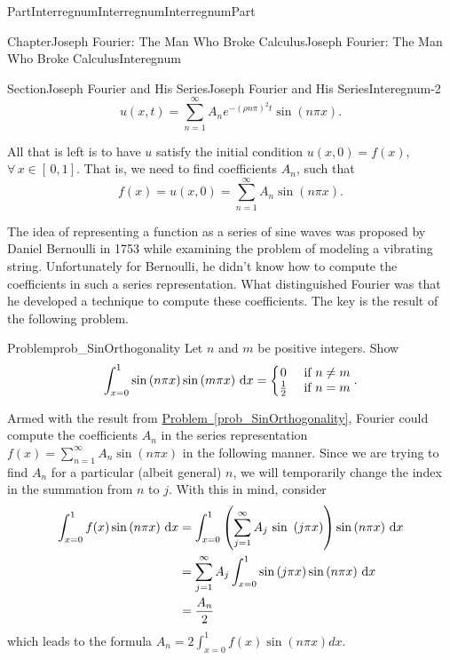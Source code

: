 \documentclass[oneside,10pt,]{book}
\newcommand{\xreffont}{\relax}
\numberwithin{equation}{part}
\newcommand{\dx}[1]{\,{\rm d}#1}
\newcommand{\amp}{&}
\begin{document}
\begin{partptx}{Part}{Interregnum}{}{Interregnum}{}{}{InterregnumPart}
\begin{chapterptx}{Chapter}{Joseph Fourier: The Man Who Broke Calculus}{}{Joseph Fourier: The Man Who Broke Calculus}{}{}{Interegnum}
\begin{sectionptx}{Section}{Joseph Fourier and His Series}{}{Joseph Fourier and His Series}{}{}{Interegnum-2}
\begin{equation*}
u(x,t)=\sum_{n=1}^\infty A_ne^{-(\rho n\pi)^2t}\sin\left(n\pi x\right)\text{.}
\end{equation*}
%
\par
All that is left is to have \(u\) satisfy the initial condition \(u(x,0)=f(x)\), \(\forall\,x\in[\,0,1]\). That is, we need to find coefficients \(A_n\), such that%
\begin{equation*}
f(x)=u(x,0)=\sum_{n=1}^\infty A_n\sin\left(n\pi x\right)\text{.}
\end{equation*}
%
\par
The idea of representing a function as a series of sine waves was proposed by Daniel Bernoulli in 1753 while examining the problem of modeling a vibrating string. Unfortunately for Bernoulli, he didn't know how to compute the coefficients in such a series representation. What distinguished Fourier was that he developed a technique to compute these coefficients. The key is the result of the following problem.%
\begin{problem}{Problem}{}{prob_SinOrthogonality}%
Let \(n\) and \(m\) be positive integers. Show%
\begin{equation*}
\int_{x=0}^1\sin\left(n\pi x\right)\sin\left(m\pi x\right)\dx{ x}= \left\{\begin{matrix}0\amp \text{ if } n\neq m\\ \frac{1}{2}\amp \text{ if } n=m \end{matrix} \right.. {}
\end{equation*}
%
\end{problem}
 Armed with the result from \hyperref[prob_SinOrthogonality]{Problem~{\xreffont\ref{prob_SinOrthogonality}}}, Fourier could compute the coefficients \(A_n\) in the series representation \(f(x)=\sum_{n=1}^\infty A_n \sin\left(n\pi x\right)\) in the following manner.  Since we are trying to find \(A_n\) for a particular (albeit general) \(n\), we will temporarily change the index in the summation from \(n\) to \(j\).  With this in mind, consider%
\begin{align*}
\int_{x=0}^1f(x)\sin\left(n\pi x\right)\dx{ x} \amp =\int_{x=0}^1\left(\sum_{j=1}^\infty A_j\text{ sin } \left(j\pi x\right)\right)\sin\left(n\pi x\right)\dx{ x}\\
\amp =\sum_{j=1}^\infty A_j\int_{x=0}^1\sin\left(j\pi x\right)\sin\left(n\pi x\right)\dx{ x}\\
\amp =\frac{A_n}{2}
\end{align*}
which leads to the formula \(A_n=2\int_{x=0}^1f(x)\sin\left(n\pi x\right)d x\).%

\end{sectionptx}
\end{chapterptx}
\end{partptx}
\end{document}
